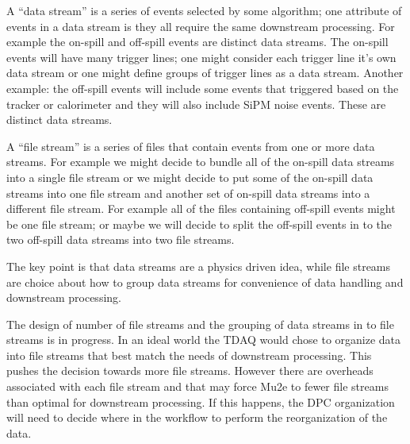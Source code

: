 
A ``data stream'' is a series of events selected by some algorithm;
one attribute of events in a data stream is they all require the same downstream processing.
For example the on-spill and off-spill events are distinct data streams.
The on-spill events will have many trigger lines; one might consider each trigger
line it's own data stream or one might define groups of trigger lines as a data stream.
Another example: the off-spill events will include some events that triggered based on
the tracker or calorimeter and they will also include SiPM noise events.
These are distinct data streams.

A ``file stream'' is a series of files that contain events from one or more data streams.
For example we might decide to bundle all of the on-spill data streams into a single
file stream or we might decide to put some of the on-spill data streams into one file
stream and another set of on-spill data streams into a different file stream.
For example all of the files containing off-spill events might be one file stream;
or maybe we will decide to split the off-spill events in to
the two off-spill data streams into two file streams.

The key point is that data streams are a physics driven idea,
while file streams are choice about how to group data streams for convenience of data handling and downstream processing.


The design of number of file streams and the grouping of data streams in to file streams
is in progress.
In an ideal world the TDAQ would chose to organize data into file streams that best match the needs
of downstream processing.
This pushes the decision towards more file streams.
However there are overheads associated with each file stream and that may force Mu2e to fewer file streams
than optimal for downstream processing.
If this happens, the DPC organization will need to decide where in the workflow to perform
the reorganization of the data.


